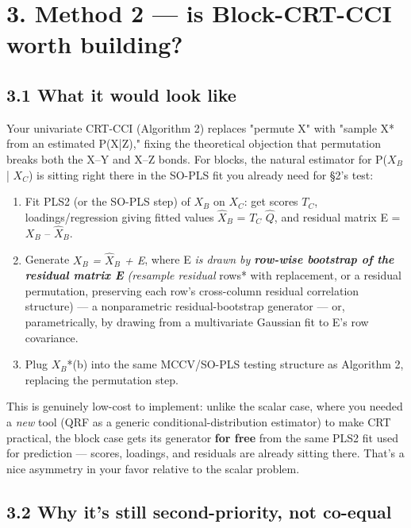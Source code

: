 \documentclass[11pt,a4paper]{article}
\begin{document}
	
	\section{3. Method 2 — is Block-CRT-CCI worth building?}
	
	\subsection{3.1 What it would look like}
	
	Your univariate CRT-CCI (Algorithm 2) replaces "permute X" with "sample X* from an estimated P(X|Z)," fixing the theoretical objection that permutation breaks both the X–Y and X–Z bonds. For blocks, the natural estimator for P(\(X_B\) | \(X_C\)) is sitting right there in the SO-PLS fit you already need for \S{}2's test:
	
	\begin{enumerate}
		\item Fit PLS2 (or the SO-PLS step) of \(X_B\) on \(X_C\): get scores \(T_C\), loadings/regression giving fitted values \(\widehat{X}_B\) = \(T_C\) \(\widehat{Q}\), and residual matrix E = \(X_B\) -- \(\widehat{X}_B\).
		\item Generate \(X_B\)\emph{ = \(\widehat{X}_B\) + E}, where E\emph{ is drawn by \textbf{row-wise bootstrap of the residual matrix E} (resample residual }rows* with replacement, or a residual permutation, preserving each row's cross-column residual correlation structure) — a nonparametric residual-bootstrap generator — or, parametrically, by drawing from a multivariate Gaussian fit to E's row covariance.
		\item Plug \(X_B\)*(b) into the same MCCV/SO-PLS testing structure as Algorithm 2, replacing the permutation step.
		
	\end{enumerate}
	This is genuinely low-cost to implement: unlike the scalar case, where you needed a \emph{new} tool (QRF as a generic conditional-distribution estimator) to make CRT practical, the block case gets its generator \textbf{for free} from the same PLS2 fit used for prediction — scores, loadings, and residuals are already sitting there. That's a nice asymmetry in your favor relative to the scalar problem.
	
	\subsection{3.2 Why it's still second-priority, not co-equal}
	
\end{document}
